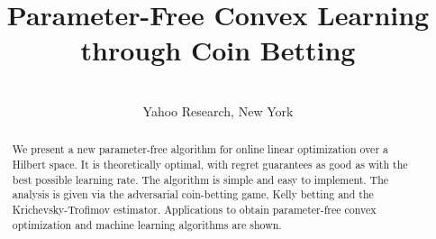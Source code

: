 \documentclass[wcp]{jmlr}
\author{%
\Name{Francesco Orabona}
\Email{francesco@orabona.com}
\AND
\Name{D\'avid P\'al}
\Email{dpal@yahoo-inc.com}\\
\addr Yahoo Research, New York}
\title{Parameter-Free Convex Learning through Coin Betting}
\begin{document}
\maketitle

\begin{abstract}
We present a new parameter-free algorithm for online linear optimization over a
Hilbert space. It is theoretically optimal, with regret guarantees as good as
with the best possible learning rate. The algorithm is simple and easy to
implement. The analysis is given via the adversarial coin-betting game, Kelly
betting and the Krichevsky-Trofimov estimator. Applications to obtain
parameter-free convex optimization and machine learning algorithms are shown.
\end{abstract}










\end{document}
